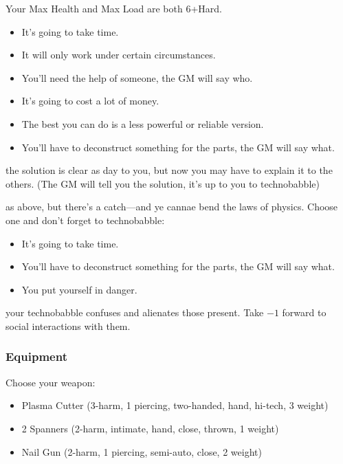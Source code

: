 Your Max Health and Max Load are both 6+Hard.

\begin{itemize}
\item It's going to take time.
\item It will only work under certain circumstances.
\item You'll need the help of someone, the GM will say who.
\item It's going to cost a lot of money.
\item The best you can do is a less powerful or reliable version.
\item You’ll have to deconstruct something for the parts, the GM will say what.
\end{itemize}

{the solution is clear as day to you, but now you may have to explain it to the others. (The GM will tell you the solution, it's up to you to technobabble)}
{as above, but there's a catch---and ye cannae bend the laws of physics. Choose one and don't forget to technobabble:
\begin{itemize}
\item It's going to take time.
\item You’ll have to deconstruct something for the parts, the GM will say what.
\item You put yourself in danger.
\end{itemize}}
{your technobabble confuses and alienates those present. Take $-1$ forward to social interactions with them.}


\subsubsection{Equipment}
Choose your weapon:
\begin{itemize}
\item Plasma Cutter (3-harm, 1 piercing, two-handed, hand, hi-tech, 3 weight)
\item 2 Spanners (2-harm, intimate, hand, close, thrown, 1 weight)
\item Nail Gun (2-harm, 1 piercing, semi-auto, close, 2 weight)
\end{itemize}

